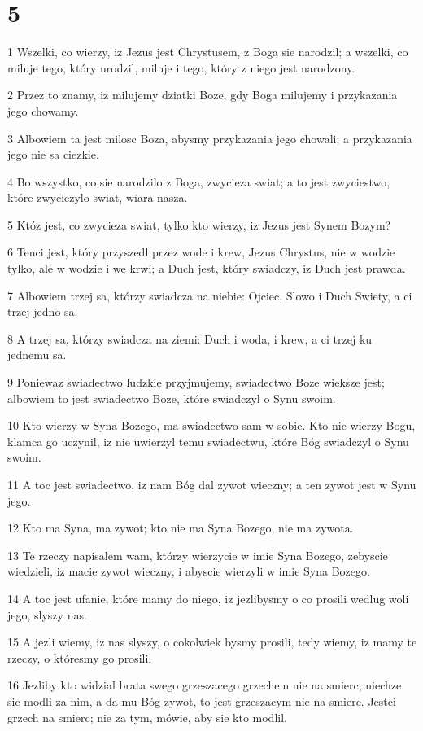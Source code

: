 \chapter{5}

\par 1 Wszelki, co wierzy, iz Jezus jest Chrystusem, z Boga sie narodzil; a wszelki, co miluje tego, który urodzil, miluje i tego, który z niego jest narodzony.
\par 2 Przez to znamy, iz milujemy dziatki Boze, gdy Boga milujemy i przykazania jego chowamy.
\par 3 Albowiem ta jest milosc Boza, abysmy przykazania jego chowali; a przykazania jego nie sa ciezkie.
\par 4 Bo wszystko, co sie narodzilo z Boga, zwycieza swiat; a to jest zwyciestwo, które zwyciezylo swiat, wiara nasza.
\par 5 Któz jest, co zwycieza swiat, tylko kto wierzy, iz Jezus jest Synem Bozym?
\par 6 Tenci jest, który przyszedl przez wode i krew, Jezus Chrystus, nie w wodzie tylko, ale w wodzie i we krwi; a Duch jest, który swiadczy, iz Duch jest prawda.
\par 7 Albowiem trzej sa, którzy swiadcza na niebie: Ojciec, Slowo i Duch Swiety, a ci trzej jedno sa.
\par 8 A trzej sa, którzy swiadcza na ziemi: Duch i woda, i krew, a ci trzej ku jednemu sa.
\par 9 Poniewaz swiadectwo ludzkie przyjmujemy, swiadectwo Boze wieksze jest; albowiem to jest swiadectwo Boze, które swiadczyl o Synu swoim.
\par 10 Kto wierzy w Syna Bozego, ma swiadectwo sam w sobie. Kto nie wierzy Bogu, klamca go uczynil, iz nie uwierzyl temu swiadectwu, które Bóg swiadczyl o Synu swoim.
\par 11 A toc jest swiadectwo, iz nam Bóg dal zywot wieczny; a ten zywot jest w Synu jego.
\par 12 Kto ma Syna, ma zywot; kto nie ma Syna Bozego, nie ma zywota.
\par 13 Te rzeczy napisalem wam, którzy wierzycie w imie Syna Bozego, zebyscie wiedzieli, iz macie zywot wieczny, i abyscie wierzyli w imie Syna Bozego.
\par 14 A toc jest ufanie, które mamy do niego, iz jezlibysmy o co prosili wedlug woli jego, slyszy nas.
\par 15 A jezli wiemy, iz nas slyszy, o cokolwiek bysmy prosili, tedy wiemy, iz mamy te rzeczy, o któresmy go prosili.
\par 16 Jezliby kto widzial brata swego grzeszacego grzechem nie na smierc, niechze sie modli za nim, a da mu Bóg zywot, to jest grzeszacym nie na smierc. Jestci grzech na smierc; nie za tym, mówie, aby sie kto modlil.
